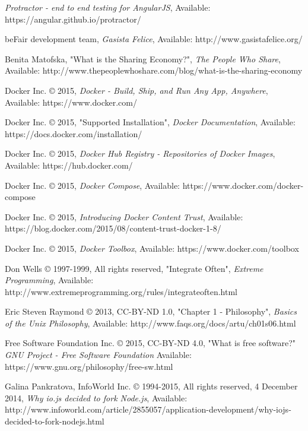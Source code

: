 \begin{thebibliography}{999}

\raggedright
{\em Protractor - end to end testing for AngularJS},
Available: https://angular.github.io/protractor/

\raggedright
beFair development team,
{\em Gasista Felice},
Available: http://www.gasistafelice.org/

\raggedright
Benita Matofska, "What is the Sharing Economy?",
{\em The People Who Share},
Available: http://www.thepeoplewhoshare.com/blog/what-is-the-sharing-economy

Docker Inc. © 2015,
{\em Docker - Build, Ship, and Run Any App, Anywhere},
Available: https://www.docker.com/

Docker Inc. © 2015, "Supported Installation",
{\em Docker Documentation},
Available: https://docs.docker.com/installation/

Docker Inc. © 2015,
{\em Docker Hub Registry - Repositories of Docker Images},
Available: https://hub.docker.com/

\raggedright
Docker Inc. © 2015,
{\em Docker Compose},
Available: https://www.docker.com/docker-compose

\raggedright
Docker Inc. © 2015,
{\em Introducing Docker Content Trust},
Available: https://blog.docker.com/2015/08/content-trust-docker-1-8/

\raggedright
Docker Inc. © 2015,
{\em Docker Toolbox},
Available: https://www.docker.com/toolbox

\raggedright
Don Wells © 1997-1999, All rights reserved, "Integrate Often",
{\em Extreme Programming},
Available: http://www.extremeprogramming.org/rules/integrateoften.html

\raggedright
Eric Steven Raymond © 2013, CC-BY-ND 1.0, "Chapter 1 - Philosophy",
{\em Basics of the Unix Philosophy},
Available: http://www.faqs.org/docs/artu/ch01s06.html

\raggedright
Free Software Foundation Inc. © 2015, CC-BY-ND 4.0, "What is free software?"
{\em GNU Project - Free Software Foundation}
Available: https://www.gnu.org/philosophy/free-sw.html

\raggedright
Galina Pankratova, InfoWorld Inc. © 1994-2015, All rights reserved, 4 December 2014,
{\em Why io.js decided to fork Node.js},
Available: http://www.infoworld.com/article/2855057/application-development/why-iojs-decided-to-fork-nodejs.html


\end{thebibliography}
